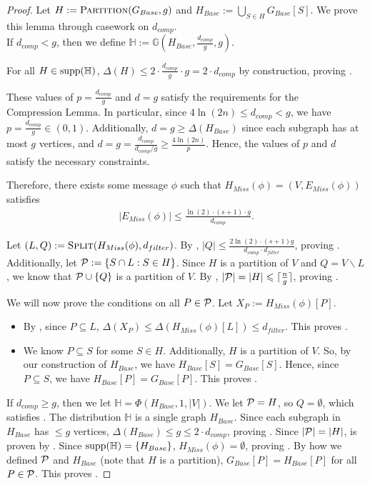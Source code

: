 \documentclass[11pt]{article}
\theoremstyle{definition}
\renewcommand{\leq}{\leqslant}
\renewcommand{\geq}{\geqslant}
\renewcommand{\le}{\leq}
\renewcommand{\ge}{\geq}
\newcommand{\supp}[1]{\ensuremath{\textnormal{\text{supp}}(#1)}}
\begin{document}
\begin{proof}
Let $H:=\textnormal{\textsc{Partition}}(G_{Base}, g)$ and $H_{Base}:=\bigcup_{S\in H}G_{Base}[S]$. We prove this lemma through casework on $d_{comp}$.\\

If $d_{comp}<g$, then we define $\mathbb{H}:=\mathbb{G}\left(H_{Base}, \frac {d_{comp}}g, g\right)$. 

For all $H\in \supp{\mathbb{H}}$, $\Delta{(H)}\le 2\cdot \frac {d_{comp}}g\cdot g=2\cdot d_{comp}$ by construction, proving . 

These values of $p=\frac {d_{comp}}g$ and $d=g$ satisfy the requirements for the $\hyperref[compression]{\text{Compression Lemma}}$. In particular, since $4\ln(2n)\le d_{comp}<g$, we have $p=\frac {d_{comp}}g\in (0, 1)$. Additionally, $d=g\ge \Delta{(H_{Base})}$ since each subgraph has at most $g$ vertices, and $d=g= \frac {d_{comp}}{d_{comp}/g}\ge \frac {4\ln (2n)}p$. Hence, the values of $p$ and $d$ satisfy the necessary constraints. 

Therefore, there exists some message $\phi$ such that $H_{Miss}(\phi)=(V, E_{Miss}(\phi))$ satisfies 
\begin{align*}
    |E_{Miss}(\phi)|\le \frac{\ln(2)\cdot (s+1)\cdot g}{d_{comp}}.
\end{align*}

Let $(L, Q):=\textnormal{\textsc{Split}}(H_{Miss}(\phi), d_{filter})$. By , $|Q|\le \frac{2\ln(2)\cdot (s+1)g}{d_{comp}\cdot d_{filter}}$, proving . Additionally, let  $\mathcal{P}:=\{S\cap L:S\in H\}$. Since $H$ is a partition of $V$ and $Q=V\backslash L$, we know that $\mathcal{P}\cup \{Q\}$ is a partition of $V$. By , $|\CP|=|H|\le \lceil\frac ng\rceil$, proving .

We will now prove the conditions on all $P\in \mathcal{P}$. Let $X_P:=H_{Miss}(\phi)[P]$. 
\begin{itemize}
    \item By , since $P\subseteq L$, $\Delta{(X_P)}\le \Delta{(H_{Miss}(\phi)[L])}\le d_{filter}$. This proves .
    \item We know $P\subseteq S$ for some $S\in H$. Additionally, $H$ is a partition of $V$. So, by our construction of $H_{Base}$, we have $H_{Base}[S]=G_{Base}[S]$. Hence, since $P\subseteq S$, we have $H_{Base}[P]=G_{Base}[P]$. This proves .
\end{itemize}

If $d_{comp}\ge g$, then we let $\mathbb{H}=\Phi(H_{Base}, 1, |V|)$. We let $\mathcal{P}=H$, so $Q=\emptyset$, which satisfies . The distribution $\mathbb{H}$ is a single graph $H_{Base}$. Since each subgraph in $H_{Base}$ has $\le g$ vertices, $\Delta{(H_{Base})}\le g\le 2\cdot d_{comp}$, proving . Since $|\mathcal{P}|=|H|$,  is proven by . Since $\supp{\mathbb{H}}=\{H_{Base}\}$, $H_{Miss}(\phi)=\emptyset$, proving . By how we defined $\mathcal{P}$ and $H_{Base}$ (note that $H$ is a partition), $G_{Base}[P]=H_{Base}[P]$ for all $P\in \mathcal{P}$. This proves . 
\end{proof}
\end{document}
